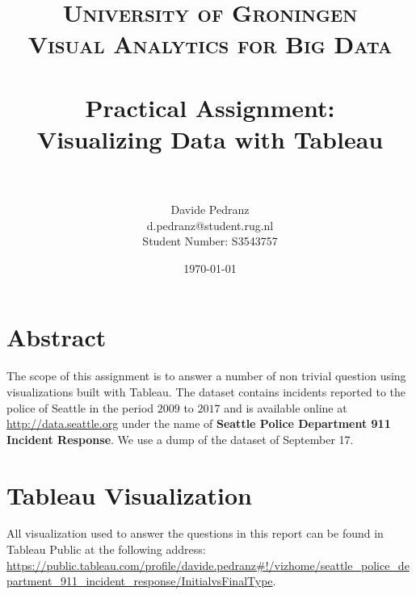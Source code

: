 \documentclass[paper=a4, fontsize=11pt]{scrartcl}
\title{	
    \normalfont
    \large \textsc{University of Groningen \\ Visual Analytics for Big Data} \\ [22pt]
    \horrule{0.5pt} \\[0.4cm]
    \huge Practical Assignment: \\ Visualizing Data with Tableau \\
    \horrule{0.5pt} \\[0.5cm]
}
\author{
    Davide Pedranz \\
    \small d.pedranz@student.rug.nl \\
    \small Student Number: S3543757    
}
\date{\vspace{0.5cm} \normalsize\today}
\numberwithin{equation}{section} %
\numberwithin{figure}{section} %
\numberwithin{table}{section} %
\begin{document}
\maketitle

\section*{Abstract}
The scope of this assignment is to answer a number of non trivial question using visualizations built with Tableau.
The dataset contains incidents reported to the police of Seattle in the period $2009$ to $2017$ and is available online at \url{http://data.seattle.org} under the name of \textbf{Seattle Police Department 911 Incident Response}.
We use a dump of the dataset of September 17.

\tableofcontents

\section*{Tableau Visualization}
All visualization used to answer the questions in this report can be found in Tableau Public at the following address:
\url{https://public.tableau.com/profile/davide.pedranz#!/vizhome/seattle_police_department_911_incident_response/InitialvsFinalType}.

\clearpage

% 
% 
% 
% 


% 
% 
\end{document}
